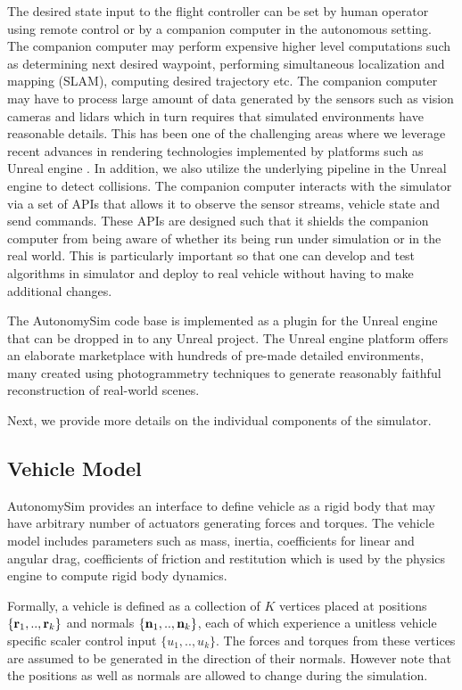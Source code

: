 \documentclass[graybox]{svmult}
\begin{document}
	The desired state input to the flight controller can be set by human operator using remote control or by a companion computer in the autonomous setting. The companion computer may perform expensive higher level computations such as determining next desired waypoint, performing simultaneous localization and mapping (SLAM), computing desired trajectory etc. The companion computer may have to process large amount of data generated by the sensors such as vision cameras and lidars which in turn requires that simulated environments have reasonable details. This has been one of the challenging areas where we leverage recent advances in rendering technologies implemented by platforms such as Unreal engine \cite{karis2013real}. In addition, we also utilize the underlying pipeline in the Unreal engine to detect collisions. The companion computer interacts with the simulator via a set of APIs that allows it to observe the sensor streams, vehicle state and send commands. These APIs are designed such that it shields the companion computer from being aware of whether its being run under simulation or in the real world. This is particularly important so that one can develop and test algorithms in simulator and deploy to real vehicle without having to make additional changes.
	
	The AutonomySim code base is implemented as a plugin for the Unreal engine that can be dropped in to any Unreal project. The Unreal engine platform offers an elaborate marketplace with hundreds of pre-made detailed environments, many created using photogrammetry techniques \cite{ue4openworld2015} to generate reasonably faithful reconstruction of real-world scenes.
	
	Next, we provide more details on the individual components of the simulator.
	
	\subsection{Vehicle Model}
	\label{sec:Vehicle}
	AutonomySim provides an interface to define vehicle as a rigid body that may have arbitrary number of actuators generating forces and torques. The vehicle model includes parameters such as mass, inertia, coefficients for linear and angular drag, coefficients of friction and restitution which is used by the physics engine to compute rigid body dynamics. 
	
	Formally, a vehicle is defined as a collection of $K$ vertices placed at positions $\{{\bf r}_1, .., {\bf r}_k\}$ and normals $\{{\bf n}_1, .., {\bf n}_k\}$, each of which experience a unitless vehicle specific scaler control input $\{u_1, .., u_k\}$. The forces and torques from these vertices are assumed to be generated in the direction of their normals. However note that the positions as well as normals are allowed to change during the simulation.
	
\end{document}
